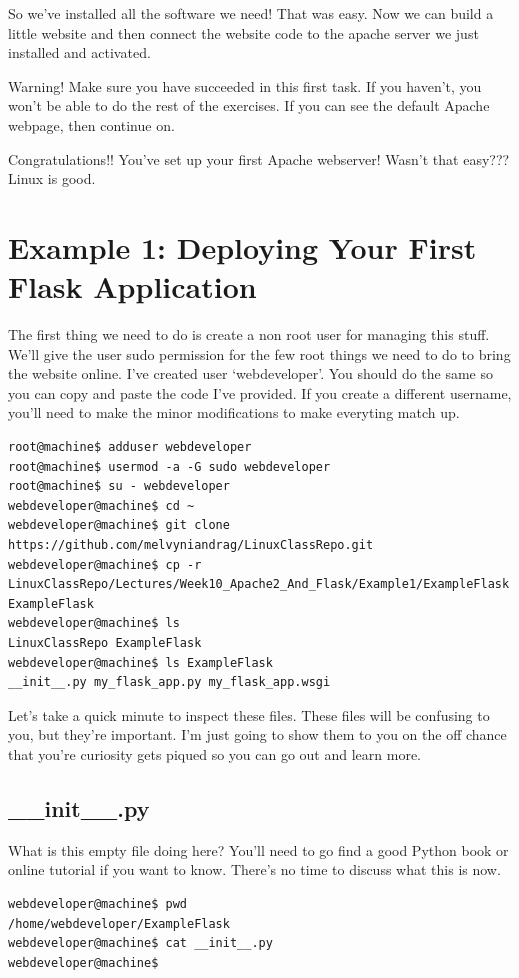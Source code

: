 \documentclass[10pt]{article}
\begin{document}
So we've installed all the software we need! That was easy. Now we can build a little website and then connect the website code to the apache server we just installed and activated.

{\Large \color{red} Warning! Make sure you have succeeded in this first task. If
you haven't, you won't be able to do the rest of the exercises. If you can see
the default Apache webpage, then continue on. }

Congratulations!! You've set up your first Apache webserver! Wasn't that easy???
Linux is good.

\section{Example 1: Deploying Your First Flask Application}
The first thing we need to do is create a non root user for managing this stuff. We'll give the user sudo permission for the few root things we need to do to bring the website online. I've created user `webdeveloper'. You should do the same so you can copy and paste the code I've provided. If you create a different username, you'll need to make the minor modifications to make everyting match up.

\begin{lstlisting}[style=term]
root@machine$ adduser webdeveloper
root@machine$ usermod -a -G sudo webdeveloper
root@machine$ su - webdeveloper
webdeveloper@machine$ cd ~
webdeveloper@machine$ git clone https://github.com/melvyniandrag/LinuxClassRepo.git
webdeveloper@machine$ cp -r
LinuxClassRepo/Lectures/Week10_Apache2_And_Flask/Example1/ExampleFlask ExampleFlask
webdeveloper@machine$ ls
LinuxClassRepo ExampleFlask
webdeveloper@machine$ ls ExampleFlask
__init__.py my_flask_app.py my_flask_app.wsgi
\end{lstlisting}

Let's take a quick minute to inspect these files. These files will be confusing
to you, but they're important. I'm just going to show them to you on the off
chance that you're curiosity gets piqued so you can go out and learn more.

\subsection{\_\_init\_\_.py}
What is this empty file doing here? You'll need to go find a good Python book or
online tutorial if you want to know. There's no time to discuss what this is
now.

\begin{lstlisting}[style=term, caption=Notice that \_\_init\_\_.py is empty]
webdeveloper@machine$ pwd 
/home/webdeveloper/ExampleFlask
webdeveloper@machine$ cat __init__.py
webdeveloper@machine$ 
\end{lstlisting}
\end{document}
